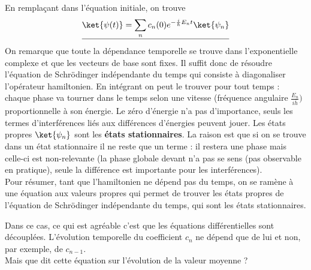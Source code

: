 En remplaçant dans l'équation initiale, on trouve
\begin{equation}
\underline{\ket{\psi(t)} = \sum_n c_n(0)e^{-\frac{i}{\hbar}E_nt}\ket{\psi_n}}
\end{equation}
On remarque que toute la dépendance temporelle se trouve dans l'exponentielle
complexe et que les vecteurs de base sont fixes.
Il suffit donc de résoudre l'équation de Schrödinger indépendante du temps qui consiste 
à diagonaliser l'opérateur hamiltonien. En intégrant on peut le trouver pour tout 
temps : chaque phase va tourner dans le temps selon une vitesse (fréquence angulaire $\frac{E_n}{i\bar{h}})$ 
proportionnelle à son énergie. Le zéro d'énergie n'a pas d'importance, seuls les termes 
d'interférences liés aux différences d'énergies peuvent jouer. Les états propres $\ket{\psi_n}$ 
sont les \textbf{états stationnaires}. La raison est que si on se trouve dans un état stationnaire il 
ne reste que un terme : il restera une phase mais celle-ci est non-relevante 
(la phase globale devant n'a pas se sens (pas observable en pratique), seule la différence est 
importante pour les interférences).\\

Pour résumer, tant que l'hamiltonien ne dépend pas du temps, on se ramène à une équation aux
valeurs propres qui permet de trouver les états propres de l'équation de Schrödinger indépendante
du temps, qui sont les états stationnaires.

Dans ce cas, ce qui est agréable c'est que les équations différentielles sont découplées.  L'évolution 
temporelle du coefficient $c_n$ ne dépend que de lui et non, par exemple, de $c_{n-1}$.\\

Mais que dit cette équation sur l'évolution de la valeur moyenne ?

